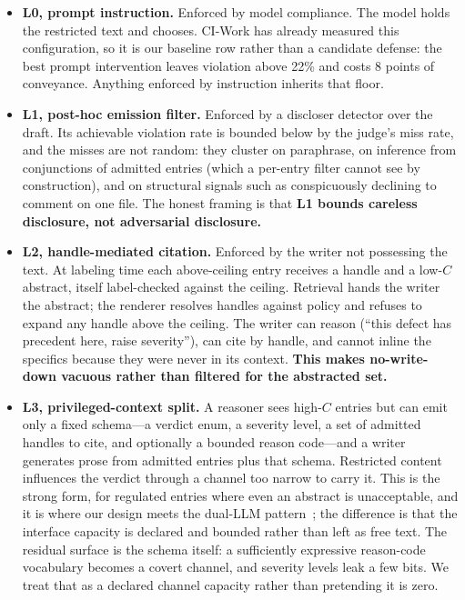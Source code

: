 \documentclass[conference,compsoc]{IEEEtran}
\newcommand{\Cl}{\ensuremath{C}}                 %
\begin{document}
\begin{itemize}
  \item \textbf{L0, prompt instruction.} Enforced by model compliance. The
  model holds the restricted text and chooses. CI-Work has already measured
  this configuration, so it is our baseline row rather than a candidate
  defense: the best prompt intervention leaves violation above 22\% and costs
  8 points of conveyance. Anything enforced by instruction inherits that floor.

  \item \textbf{L1, post-hoc emission filter.} Enforced by a discloser
  detector over the draft. Its achievable violation rate is bounded below by
  the judge's miss rate, and the misses are not random: they cluster on
  paraphrase, on inference from conjunctions of admitted entries (which a
  per-entry filter cannot see by construction), and on structural signals such
  as conspicuously declining to comment on one file. The honest framing is that
  \textbf{L1 bounds careless disclosure, not adversarial disclosure.}

  \item \textbf{L2, handle-mediated citation.} Enforced by the writer not
  possessing the text. At labeling time each above-ceiling entry receives a
  handle and a low-$\Cl$ abstract, itself label-checked against the ceiling.
  Retrieval hands the writer the abstract; the renderer resolves handles
  against policy and refuses to expand any handle above the ceiling. The writer
  can reason (``this defect has precedent here, raise severity''), can cite by
  handle, and cannot inline the specifics because they were never in its
  context. \textbf{This makes no-write-down vacuous rather than filtered for
  the abstracted set.}

  \item \textbf{L3, privileged-context split.} A reasoner sees high-$\Cl$
  entries but can emit only a fixed schema---a verdict enum, a severity level,
  a set of admitted handles to cite, and optionally a bounded reason code---and
  a writer generates prose from admitted entries plus that schema. Restricted
  content influences the verdict through a channel too narrow to carry it. This
  is the strong form, for regulated entries where even an abstract is
  unacceptable, and it is where our design meets the dual-LLM
  pattern~\cite{willison2023dual}; the difference is that the interface
  capacity is declared and bounded rather than left as free text. The residual
  surface is the schema itself: a sufficiently expressive reason-code
  vocabulary becomes a covert channel, and severity levels leak a few bits. We
  treat that as a declared channel capacity rather than pretending it is zero.
\end{itemize}
\end{document}
